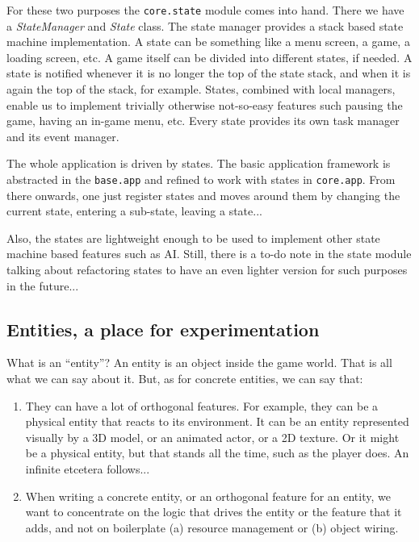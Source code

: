 \documentclass[a4paper,10pt]{article}
\begin{document}
For these two purposes the \texttt{core.state} module comes into
hand. There we have a \emph{StateManager} and \emph{State} class. The
state manager provides a stack based state machine implementation. A
state can be something like a menu screen, a game, a loading screen,
etc. A game itself can be divided into different states, if needed. A
state is notified whenever it is no longer the top of the state stack,
and when it is again the top of the stack, for example. States,
combined with local managers, enable us to implement trivially 
otherwise not-so-easy features such pausing the game, having an
in-game menu, etc. Every state provides its own task manager and its
event manager.

The whole application is driven by states. The basic application
framework is abstracted in the \texttt{base.app} and refined to work
with states in \texttt{core.app}. From there onwards, one just
register states and moves around them by changing the current state,
entering a sub-state, leaving a state...

Also, the states are lightweight enough to be used to implement other
state machine based features such as AI. Still, there is a to-do note
in the state module talking about refactoring states to have an even
lighter version for such purposes in the future...


\subsection{Entities, a place for experimentation}
\label{ref:entities}
What is an ``entity''? An entity is an object inside the game
world. That is all what we can say about it. But, as for concrete
entities, we can say that:

\begin{enumerate}
\item They can have a lot of orthogonal features. For example, they
  can be a physical entity that reacts to its environment. It can be
  an entity represented visually by a 3D model, or an animated actor,
  or a 2D texture. Or it might be a physical entity, but that stands
  all the time, such as the player does. An infinite etcetera
  follows...

\item When writing a concrete entity, or an orthogonal feature for an
  entity, we want to concentrate on the logic that drives the entity
  or the feature that it adds, and not on boilerplate (a) resource
  management or (b) object wiring.
\end{enumerate}
\end{document}
